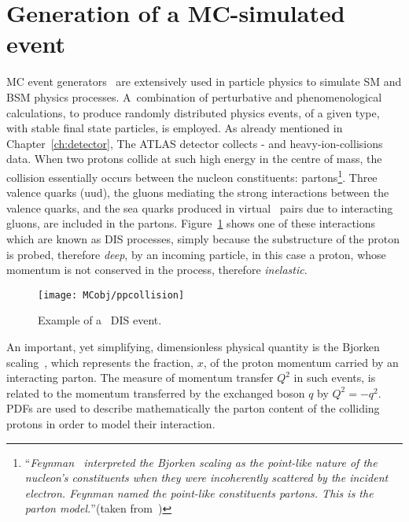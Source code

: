	\section{Generation of a MC-simulated event}
	\label{sec:evGen}

		\ac{MC} event generators~\cite{Buckley:2011ms} are extensively used in particle physics to simulate \ac{SM} and \ac{BSM} physics processes. A combination of perturbative and phenomenological calculations, to produce randomly distributed physics events, of a given type, with stable final state particles, is employed. As already mentioned in Chapter~\ref{ch:detector}, The \ac{ATLAS} detector collects \pp- and heavy-ion-collisions data. When two protons collide at such high energy in the centre of mass, the collision essentially occurs between the nucleon constituents: partons\footnote{``\emph{Feynman~\cite{PhysRevLett.23.1415} interpreted the Bjorken scaling as the point-like nature of the nucleon's constituents when they were incoherently scattered by the incident electron. Feynman named the point-like constituents partons. This is the parton model.}''(taken from~\cite{Yan:2014kna})}. Three valence quarks (uud), the gluons mediating the strong interactions between the valence quarks, and the sea quarks produced in virtual \qqbar\ pairs due to interacting gluons, are included in the partons. Figure~\ref{fig:DIS} shows one of these interactions which are known as \ac{DIS} processes, simply because the substructure of the proton is probed, therefore \emph{deep}, by an incoming particle, in this case a proton, whose momentum is not conserved in the process, therefore \emph{inelastic}.

		\begin{figure}[!htb]
			\centering
			\texttt{[image: MCobj/ppcollision]}
			\caption{\label{fig:DIS} Example of a \pp\ \ac{DIS} event.}
		\end{figure}

		An important, yet simplifying, dimensionless physical quantity is the Bjorken scaling~\cite{PhysRev.179.1547}, which represents the fraction, $x$, of the proton momentum carried by an interacting parton. The measure of momentum transfer $Q^2$ in such events, is related to the momentum transferred by the exchanged boson $q$ by $Q^2 = -q^2$. \acp{PDF} are used to describe mathematically the parton content of the colliding protons in order to model their interaction.  

